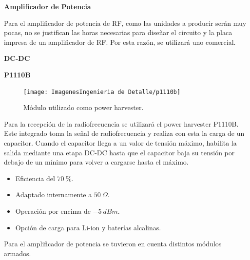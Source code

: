 \textbf{Amplificador de Potencia}

Para el amplificador de potencia de RF, como las unidades a producir serán muy pocas, no se justifican las horas necesarias para diseñar el circuito y la placa impresa de un amplificador de RF. Por esta razón, se utilizará uno comercial. 

\textbf{DC-DC}

\tbc

\textbf{P1110B}

\begin{figure}[H]
	\centering	
	\texttt{[image: ImagenesIngenieria de Detalle/p1110b]}
	\caption{Módulo utilizado como power harvester.}
	\label{fig:p1110b}
\end{figure}

Para la recepción de la radiofrecuencia se utilizará el power harvester P1110B. Este integrado toma la señal de radiofrecuencia y realiza con esta la carga de un capacitor. Cuando el capacitor llega a un valor de tensión máximo, habilita la salida mediante una etapa DC-DC hasta que el capacitor baja su tensión por debajo de un mínimo para volver a cargarse hasta el máximo.


\begin{itemize}
\item Eficiencia del $70 \ \%$.
\item Adaptado internamente a $50 \ \Omega$.
\item Operación por encima de $-5 \ dBm$.
\item Opción de carga para Li-ion y baterías alcalinas.
\end{itemize}


Para el amplificador de potencia se tuvieron en cuenta distintos módulos armados.

